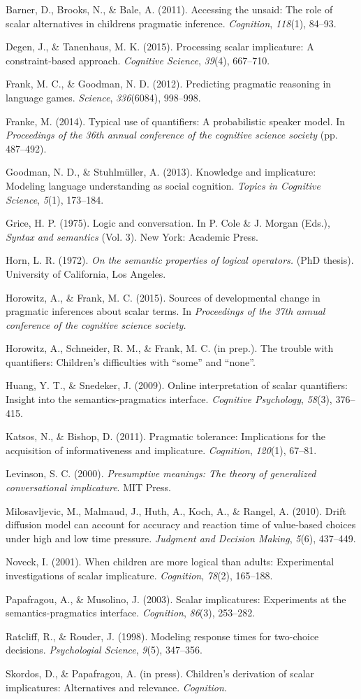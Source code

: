 \documentclass[10pt, letterpaper]{article}
\begin{document}
Barner, D., Brooks, N., \& Bale, A. (2011). Accessing the unsaid: The
role of scalar alternatives in childrens pragmatic inference.
\emph{Cognition}, \emph{118}(1), 84--93.

Degen, J., \& Tanenhaus, M. K. (2015). Processing scalar implicature: A
constraint-based approach. \emph{Cognitive Science}, \emph{39}(4),
667--710.

Frank, M. C., \& Goodman, N. D. (2012). Predicting pragmatic reasoning
in language games. \emph{Science}, \emph{336}(6084), 998--998.

Franke, M. (2014). Typical use of quantifiers: A probabilistic speaker
model. In \emph{Proceedings of the 36th annual conference of the
cognitive science society} (pp. 487--492).

Goodman, N. D., \& Stuhlm{ü}ller, A. (2013). Knowledge and implicature:
Modeling language understanding as social cognition. \emph{Topics in
Cognitive Science}, \emph{5}(1), 173--184.

Grice, H. P. (1975). Logic and conversation. In P. Cole \& J. Morgan
(Eds.), \emph{Syntax and semantics} (Vol. 3). New York: Academic Press.

Horn, L. R. (1972). \emph{On the semantic properties of logical
operators.} (PhD thesis). University of California, Los Angeles.

Horowitz, A., \& Frank, M. C. (2015). Sources of developmental change in
pragmatic inferences about scalar terms. In \emph{Proceedings of the
37th annual conference of the cognitive science society.}

Horowitz, A., Schneider, R. M., \& Frank, M. C. (in prep.). The trouble
with quantifiers: Children's difficulties with ``some'' and ``none''.

Huang, Y. T., \& Snedeker, J. (2009). Online interpretation of scalar
quantifiers: Insight into the semantics-pragmatics interface.
\emph{Cognitive Psychology}, \emph{58}(3), 376--415.

Katsos, N., \& Bishop, D. (2011). Pragmatic tolerance: Implications for
the acquisition of informativeness and implicature. \emph{Cognition},
\emph{120}(1), 67--81.

Levinson, S. C. (2000). \emph{Presumptive meanings: The theory of
generalized conversational implicature}. MIT Press.

Milosavljevic, M., Malmaud, J., Huth, A., Koch, A., \& Rangel, A.
(2010). Drift diffusion model can account for accuracy and reaction time
of value-based choices under high and low time pressure. \emph{Judgment
and Decision Making}, \emph{5}(6), 437--449.

Noveck, I. (2001). When children are more logical than adults:
Experimental investigations of scalar implicature. \emph{Cognition},
\emph{78}(2), 165--188.

Papafragou, A., \& Musolino, J. (2003). Scalar implicatures: Experiments
at the semantics-pragmatics interface. \emph{Cognition}, \emph{86}(3),
253--282.

Ratcliff, R., \& Rouder, J. (1998). Modeling response times for
two-choice decisions. \emph{Psychologial Science}, \emph{9}(5),
347--356.

Skordos, D., \& Papafragou, A. (in press). Children's derivation of
scalar implicatures: Alternatives and relevance. \emph{Cognition}.
\end{document}
